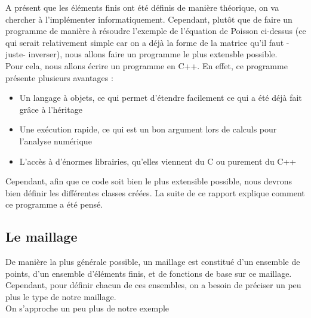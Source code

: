A présent que les éléments finis ont été définis de manière théorique, on va chercher à l'implémenter informatiquement. Cependant, plutôt que de faire un programme de manière à résoudre l'exemple de l'équation de Poisson ci-dessus (ce qui serait relativement simple car on a déjà la forme de la matrice qu'il faut -juste- inverser), nous allons faire un programme le plus extensble possible.\\
Pour cela, nous allons écrire un programme en C++. En effet, ce programme présente plusieurs avantages :
\begin{itemize}
	\item Un langage à objets, ce qui permet d'étendre facilement ce qui a été déjà fait grâce à l'héritage
	\item Une exécution rapide, ce qui est un bon argument lors de calculs pour l'analyse numérique
	\item L'accès à d'énormes librairies, qu'elles viennent du C ou purement du C++
\end{itemize}

Cependant, afin que ce code soit bien le plus extensible possible, nous devrons bien définir les différentes classes créées. La suite de ce rapport explique comment ce programme a été pensé.

\subsection{Le maillage}
De manière la plus générale possible, un maillage est constitué d'un ensemble de points, d'un ensemble d'éléments finis, et de fonctions de base sur ce maillage. Cependant, pour définir chacun de ces ensembles, on a besoin de préciser un peu plus le type de notre maillage.\\
On s'approche un peu plus de notre exemple 
